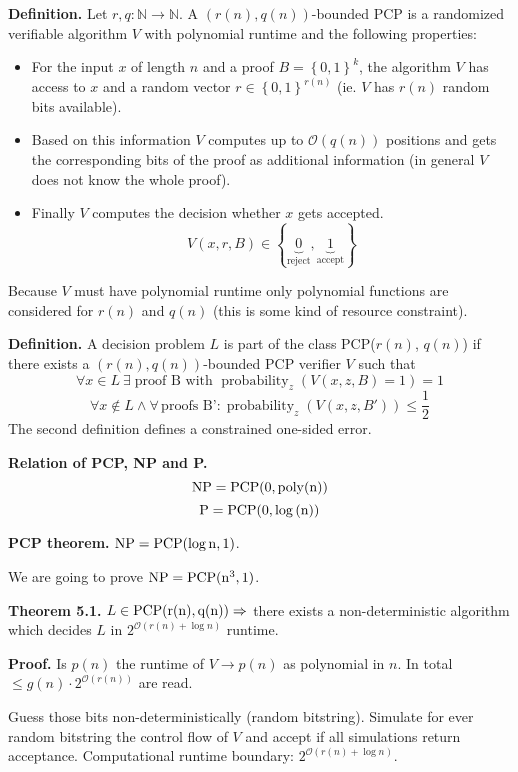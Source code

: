 \documentclass[a4paper]{article}
\newcommand{\cls}[1]{\rm{#1}}
\newcommand{\set}[1]{\left\{#1\right\}}
\DeclareMathOperator{\prop}{probability}
\begin{document}
\textbf{Definition.}
  Let $r, q: \mathbb{N} \rightarrow \mathbb{N}$.
  A $(r(n), q(n))$-bounded PCP is a randomized verifiable algorithm $V$
  with polynomial runtime and the following properties:
\begin{itemize}
  \item For the input $x$ of length $n$ and a proof $B = \set{0,1}^k$,
    the algorithm $V$ has access to $x$ and a random vector
    $r \in \set{0,1}^{r(n)}$ (ie. $V$ has $r(n)$ random bits available).
  \item Based on this information $V$ computes up to $\mathcal{O}(q(n))$
    positions and gets the corresponding bits of the proof as additional
    information (in general $V$ does not know the whole proof).
  \item Finally $V$ computes the decision whether $x$ gets accepted.
    \[
      V(x, r, B) \in \set{\underbrace{0}_{\text{reject}},
                          \underbrace{1}_{\text{accept}}}
    \]
\end{itemize}

Because $V$ must have polynomial runtime only polynomial functions are considered for $r(n)$ and $q(n)$ (this is some kind of resource constraint).

\textbf{Definition.}
  A decision problem $L$ is part of the class PCP($r(n)$, $q(n)$)
  if there exists a $(r(n), q(n))$-bounded PCP verifier $V$
  such that
  \[
    \forall x \in L \:\exists\; \text{proof B with }
      \prop_z(V(x, z, B) = 1) = 1
  \] \[
    \forall x \notin L \land \forall\, \text{proofs B'}:
      \prop_z(V(x, z, B')) \leq \frac12
  \]
  The second definition defines a constrained one-sided error.

\textbf{Relation of PCP, \cls{NP} and P.}
\[
  \cls{NP} = \cls{PCP}(0, \operatorname{poly}(n))
\] \[
  \cls{P} = \cls{PCP}(0, \log{(n)})
\]

\textbf{PCP theorem.}
  $\cls{NP} = \cls{PCP}(\log{n}, 1)$.

We are going to prove $\cls{NP} = \cls{PCP}(n^3, 1)$.

\textbf{Theorem 5.1.}
  $L \in \cls{PCP}(r(n), q(n)) \Rightarrow$ there exists a non-deterministic
  algorithm which decides $L$ in $2^{\mathcal{O}(r(n) + \log{n})}$ runtime.

\textbf{Proof.}
  Is $p(n)$ the runtime of $V \rightarrow p(n)$ as polynomial in $n$.
  In total $\leq g(n) \cdot 2^{\mathcal{O}(r(n))}$ are read.

  Guess those bits non-deterministically (random bitstring).
  Simulate for ever random bitstring the control flow of $V$ and
  accept if all simulations return acceptance.
  Computational runtime boundary: $2^{\mathcal{O}(r(n) + \log{n})}$.
\end{document}
